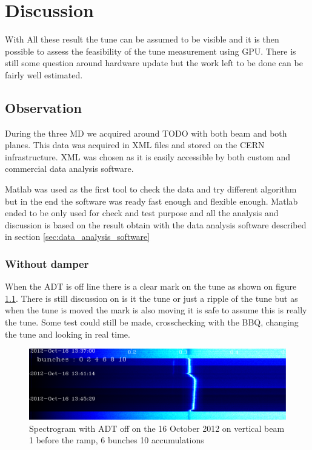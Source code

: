 
\chapter{Discussion}

With All these result the tune can be assumed to be visible and it is then possible to assess the feasibility of the tune measurement using \gls{GPU}. There is still some question around hardware update but the work left to be done can be fairly well estimated.

\section{Observation}

During the three \gls{MD} we acquired around TODO with both beam and both planes. This data was acquired in XML files and stored on the \gls{CERN} infrastructure. XML was chosen as it is easily accessible by both custom and commercial data analysis software.

Matlab was used as the first tool to check the data and try different algorithm but in the end the software was ready fast enough and flexible enough. Matlab ended to be only used for check and test purpose and all the analysis and discussion is based on the result obtain with the data analysis software described in section \ref{sec:data_analysis_software}

	\subsection{Without damper}

	When the \gls{ADT} is off line there is a clear mark on the tune as shown on figure \ref{fig:adt_off}. There is still discussion on is it the tune or just a ripple of the tune but as when the tune is moved the mark is also moving it is safe to assume this is really the tune. Some test could still be made, crosschecking with the \gls{BBQ}, changing the tune and looking in real time.

	\begin{figure}[H]
	\caption{Spectrogram with ADT off on the 16 October 2012 on vertical beam 1 before the ramp, 6 bunches 10 accumulations}
	\label{fig:adt_off}
	\centering
	\includegraphics[scale=0.3]{md-121016-vb1-m1-6bunches-10acc-1337-1349-ADT-off.pdf}
	\end{figure}

